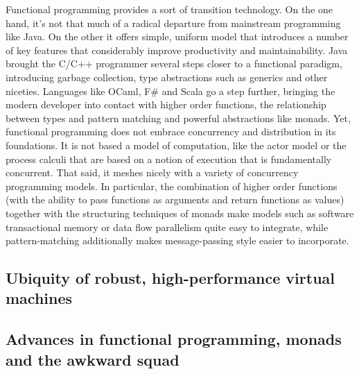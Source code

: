 Functional programming provides a sort of transition technology. On
the one hand, it's not that much of a radical departure from
mainstream programming like Java. On the other it offers simple,
uniform model that introduces a number of key features that
considerably improve productivity and maintainability. Java brought
the C/C++ programmer several steps closer to a functional paradigm,
introducing garbage collection, type abstractions such as generics and
other niceties. Languages like OCaml, F# and Scala go a step further,
bringing the modern developer into contact with higher order
functions, the relationship between types and pattern matching and
powerful abstractions like monads. Yet, functional programming does
not embrace concurrency and distribution in its foundations. It is not
based a model of computation, like the actor model or the process
calculi that are based on a notion of execution that is fundamentally
concurrent. That said, it meshes nicely with a variety of concurrency
programming models. In particular, the combination of higher order
functions (with the ability to pass functions as arguments and return
functions as values) together with the structuring techniques of
monads make models such as software transactional memory or data flow
parallelism quite easy to integrate, while pattern-matching
additionally makes message-passing style easier to incorporate.

\subsection{Ubiquity of robust, high-performance virtual machines}



\subsection{Advances in functional programming, monads and the awkward squad}

